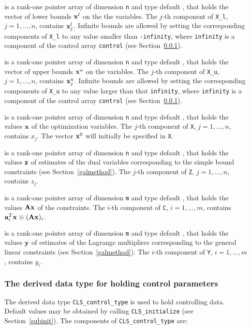 \documentclass{galahad}
\newcommand{\packagename}{CLS}
\begin{document}
\begin{description}
 is a rank-one pointer array of dimension {\tt n} and type
default \realdp, that holds
the vector of lower bounds ${\mathbf{x}}^{l}$ on the the variables.
The $j$-th component of {\tt X\_l}, $j = 1, \ldots , n$,
contains ${\mathbf{x}}_{j}^{l}$.
Infinite bounds are allowed by setting the corresponding
components of {\tt X\_l} to any value smaller than {\tt -infinity},
where {\tt infinity} is a component of the control array {\tt control}
(see Section~\ref{typecontrol}).

 is a rank-one pointer array of dimension {\tt n} and type
default \realdp, that holds
the vector of upper bounds ${\mathbf{x}}^{u}$ on the variables.
The $j$-th component of {\tt X\_u}, $j = 1, \ldots , n$,
contains ${\mathbf{x}}_{j}^{u}$.
Infinite bounds are allowed by setting the corresponding
components of {\tt X\_u} to any value larger than that {\tt infinity},
where {\tt infinity} is a component of the control array {\tt control}
(see Section~\ref{typecontrol}).

 is a rank-one pointer array of dimension {\tt n} and type
default \realdp,
that holds the values ${\mathbf{x}}$ of the optimization variables.
The $j$-th component of {\tt X}, $j = 1,  \ldots , n$, contains $x_{j}$.
The vector ${\mathbf{x}}^{0}$ will initially be specified in {\tt X}.

 is a rank-one pointer array of dimension {\tt n} and type default
\realdp, that holds
the values ${\mathbf{z}}$ of estimates  of the dual variables
corresponding to the simple bound constraints (see Section~\ref{galmethod}).
The $j$-th component of {\tt Z}, $j = 1,  \ldots ,  n$, contains $z_{j}$.

 is a rank-one pointer array of dimension {\tt m} and type default
\realdp, that holds
the values ${\mathbf{A}} {\mathbf{x}}$ of the constraints.
The $i$-th component of {\tt C}, $i = 1,  \ldots ,  m$, contains
${\mathbf{a}}_{i}^{T}{\mathbf{x}} \equiv ({\mathbf{A}} {\mathbf{x}})_{i}$.

 is a rank-one pointer array of dimension {\tt m} and type
default \realdp, that holds
the values ${\mathbf{y}}$ of estimates  of the Lagrange multipliers
corresponding to the general linear constraints (see Section~\ref{galmethod}).
The $i$-th component of {\tt Y}, $i = 1,  \ldots ,  m$, contains $y_{i}$.

\end{description}


\subsubsection{The derived data type for holding control
 parameters}\label{typecontrol}
The derived data type
{\tt \packagename\_control\_type}
is used to hold controlling data. Default values may be obtained by calling
{\tt \packagename\_initialize}
(see Section~\ref{subinit}). The components of
{\tt \packagename\_control\_type}
are:
\end{document}
